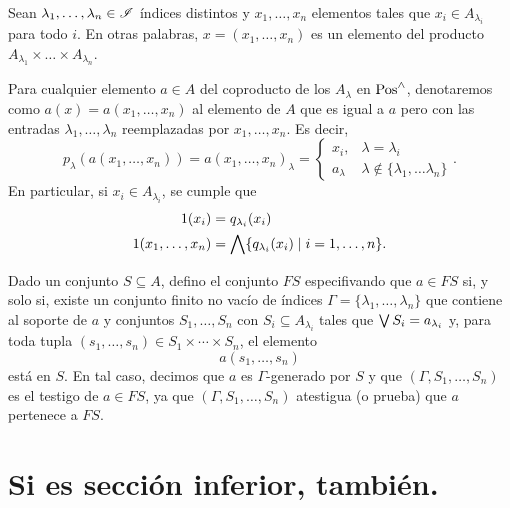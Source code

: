 \begin{defn}
Sean $\lambda_1,\dots,\lambda_n\in \mathscr{I}$ índices distintos y
$x_1,\dots,x_n$ elementos tales que
$x_i\in A_{\lambda_i}$ para todo $i$.
En otras palabras, $x=(x_1,\dots,x_n)$ es un elemento del producto
$A_{\lambda_1}\times\dots\times A_{\lambda_n}$.

Para cualquier elemento $a\in A$ del coproducto de los $A_\lambda$
en $\mathrm{Pos}^{\wedge}$, denotaremos como
$a(x)=a(x_1,\dots,x_n)$ al elemento de $A$ que
es igual a $a$ pero con las entradas $\lambda_1,\dots,\lambda_n$
reemplazadas por $x_1,\dots,x_n$.
Es decir,
\[
    p_\lambda(a(x_1,\dots,x_n))
    =
    a(x_1,\dots,x_n)_\lambda
    =
    \begin{cases}
        x_i, & \lambda = \lambda_i \\
        a_\lambda & \lambda\not\in\{\lambda_1,\dots\lambda_n\}
    \end{cases}
.\]
En particular, si $x_i\in A_{\lambda_i}$, se cumple que
\begin{align*}
  1(x_i)
    &= q_{\lambda_i}(x_i) \\
  1(x_1,\dots,x_n)
    &= \bigwedge\{q_{\lambda_i}(x_i) \mid i=1,\dots,n\}.
\end{align*}
%
\end{defn}

\begin{defn}
  Dado un conjunto $S\subseteq A$, defino el conjunto $FS$
  especifivando que $a\in FS$ si, y solo si,
  existe un conjunto finito no vacío de índices
  $\Gamma=\{\lambda_1,\dots,\lambda_n\}$ que contiene al
  soporte de $a$ y conjuntos $S_1,\dots,S_n$ con
  $S_i\subseteq A_{\lambda_i}$ tales que $\bigvee S_i =
  a_{\lambda_i}$ y, para toda tupla
  $(s_1,\dots,s_n)\in S_1\times\cdots\times S_n$, el elemento
  \[
    a(s_1,\dots,s_n)
  \]
  está en $S$.
  En tal caso, decimos que $a$ es $\Gamma$-generado por $S$ y
  que $(\Gamma,S_1,\dots,S_n)$ es el testigo de $a\in FS$,
  ya que $(\Gamma,S_1,\dots,S_n)$ atestigua (o prueba) que
  $a$ pertenece a $FS$.
\end{defn}

\section{Si  es sección inferior,  también.}

